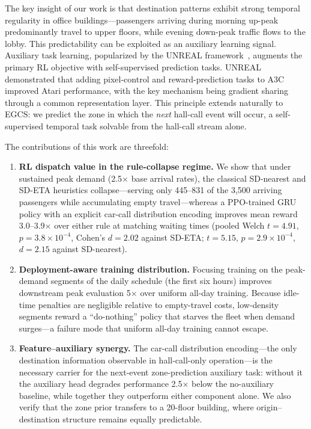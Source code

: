 \documentclass{ieeeaccess}
\begin{document}
The key insight of our work is that destination patterns exhibit
strong temporal regularity in office buildings---passengers arriving
during morning up-peak predominantly travel to upper floors, while
evening down-peak traffic flows to the lobby. This predictability can
be exploited as an auxiliary learning signal. Auxiliary task
learning, popularized by the UNREAL
framework~\cite{jaderberg2017unreal}, augments the primary RL
objective with self-supervised prediction tasks. UNREAL demonstrated
that adding pixel-control and reward-prediction tasks to A3C improved
Atari performance, with the key mechanism being gradient sharing
through a common representation layer. This principle extends
naturally to EGCS: we predict the zone in which the \emph{next}
hall-call event will occur, a self-supervised temporal task
solvable from the hall-call stream alone.


The contributions of this work are threefold:
\begin{enumerate}
    \item \textbf{RL dispatch value in the rule-collapse regime.}
    We show that under sustained peak demand (2.5$\times$ base
    arrival rates), the classical SD-nearest and SD-ETA heuristics
collapse---serving only 445--831 of the 3{,}500 arriving passengers
    while accumulating empty travel---whereas a PPO-trained GRU policy
    with an explicit car-call distribution encoding improves mean
    reward 3.0--3.9$\times$ over either rule at matching waiting times
    (pooled Welch
    $t = 4.91$, $p = 3.8\times10^{-4}$, Cohen's $d = 2.02$ against
    SD-ETA; $t = 5.15$, $p = 2.9\times10^{-4}$, $d = 2.15$ against
    SD-nearest).
    \item \textbf{Deployment-aware training distribution.} Focusing
    training on the peak-demand segments of the daily schedule (the
    first six hours) improves downstream peak evaluation 5$\times$
    over uniform all-day training. Because idle-time penalties are
    negligible relative to empty-travel costs, low-density segments
    reward a ``do-nothing'' policy that starves the fleet when demand
    surges---a failure mode that uniform all-day training cannot
    escape.
    \item \textbf{Feature--auxiliary synergy.} The car-call
    distribution encoding---the only destination information
    observable in hall-call-only operation---is the necessary
    carrier for the next-event zone-prediction auxiliary task:
    without it the auxiliary head degrades performance
    2.5$\times$ below the no-auxiliary baseline, while together they
    outperform either component alone. We also verify that the zone
    prior transfers to a 20-floor building, where origin--
    destination structure remains equally predictable.
\end{enumerate}
\end{document}
